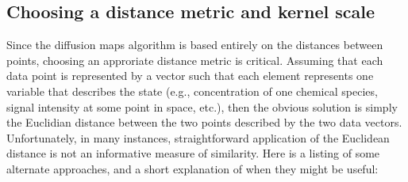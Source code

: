 \documentclass[12pt]{article}
\begin{document}
\subsection{Choosing a distance metric and kernel scale}

Since the diffusion maps algorithm is based entirely on the distances between points, choosing an approriate distance metric is critical. Assuming that each data point is represented by a vector such that each element represents one variable that describes the state (e.g., concentration of one chemical species, signal intensity at some point in space, etc.), then the obvious solution is simply the Euclidian distance between the two points described by the two data vectors. Unfortunately, in many instances, straightforward application of the Euclidean distance is not an informative measure of similarity. Here is a listing of some alternate approaches, and a short explanation of when they might be useful:
\end{document}
